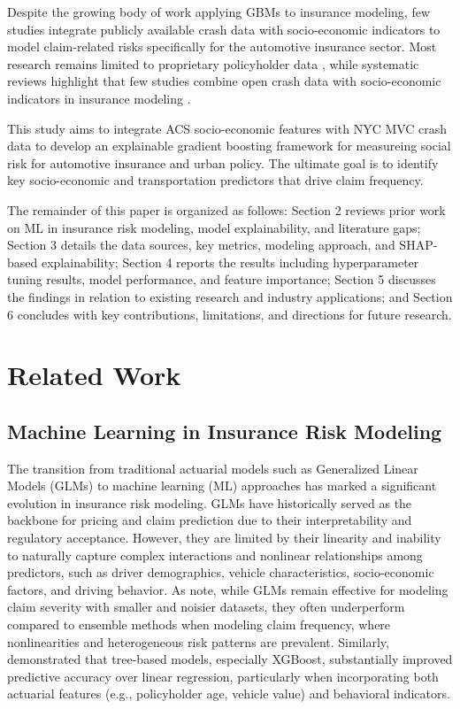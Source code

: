 \documentclass[
  number,
  review,
  3p]{elsarticle}
\begin{document}
Despite the growing body of work applying GBMs to insurance modeling,
few studies integrate publicly available crash data with socio-economic
indicators to model claim-related risks specifically for the automotive
insurance sector. Most research remains limited to proprietary
policyholder data \citep{henckaerts, mohamed}, while systematic reviews
highlight that few studies combine open crash data with socio-economic
indicators in insurance modeling \citep{ali, behboudi}.

This study aims to integrate ACS socio-economic features with NYC MVC
crash data to develop an explainable gradient boosting framework for
measureing social risk for automotive insurance and urban policy. The
ultimate goal is to identify key socio-economic and transportation
predictors that drive claim frequency.

The remainder of this paper is organized as follows: Section 2 reviews
prior work on ML in insurance risk modeling, model explainability, and
literature gaps; Section 3 details the data sources, key metrics,
modeling approach, and SHAP-based explainability; Section 4 reports the
results including hyperparameter tuning results, model performance, and
feature importance; Section 5 discusses the findings in relation to
existing research and industry applications; and Section 6 concludes
with key contributions, limitations, and directions for future research.

\section{Related Work}\label{sec-lit-review}

\subsection{\texorpdfstring{\textbf{Machine Learning in Insurance Risk
Modeling}}{Machine Learning in Insurance Risk Modeling}}\label{machine-learning-in-insurance-risk-modeling}

The transition from traditional actuarial models such as Generalized
Linear Models (GLMs) to machine learning (ML) approaches has marked a
significant evolution in insurance risk modeling. GLMs have historically
served as the backbone for pricing and claim prediction due to their
interpretability and regulatory acceptance. However, they are limited by
their linearity and inability to naturally capture complex interactions
and nonlinear relationships among predictors, such as driver
demographics, vehicle characteristics, socio-economic factors, and
driving behavior. As \citet{clemente} note, while GLMs remain effective
for modeling claim severity with smaller and noisier datasets, they
often underperform compared to ensemble methods when modeling claim
frequency, where nonlinearities and heterogeneous risk patterns are
prevalent. Similarly, \citet{jonkheijm} demonstrated that tree-based
models, especially XGBoost, substantially improved predictive accuracy
over linear regression, particularly when incorporating both actuarial
features (e.g., policyholder age, vehicle value) and behavioral
indicators.
\end{document}
